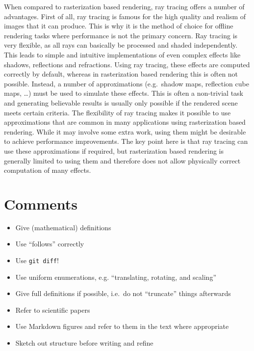 When compared to rasterization based rendering, ray tracing oﬀers a
number of advantages. First of all, ray tracing is famous for the high
quality and realism of images that it can produce. This is why it is the
method of choice for oﬄine rendering tasks where performance is not the
primary concern. Ray tracing is very ﬂexible, as all rays can basically
be processed and shaded independently. This leads to simple and
intuitive implementations of even complex eﬀects like shadows,
reﬂections and refractions. Using ray tracing, these eﬀects are computed
correctly by default, whereas in rasterization based rendering this is
often not possible. Instead, a number of approximations (e.g.~shadow
maps, reﬂection cube maps, \ldots{}) must be used to simulate these
eﬀects. This is often a non-trivial task and generating believable
results is usually only possible if the rendered scene meets certain
criteria. The ﬂexibility of ray tracing makes it possible to use
approximations that are common in many applications using rasterization
based rendering. While it may involve some extra work, using them might
be desirable to achieve performance improvements. The key point here is
that ray tracing can use these approximations if required, but
rasterization based rendering is generally limited to using them and
therefore does not allow physically correct computation of many eﬀects.

\section{Comments}\label{comments}

\begin{itemize}
\itemsep1pt\parskip0pt
\item
  Give (mathematical) definitions
\item
  Use ``follows'' correctly
\item
  Use \texttt{git diff}!
\item
  Use uniform enumerations, e.g. ``translating, rotating, and scaling''
\item
  Give full definitions if possible, i.e.~do not ``truncate'' things
  afterwards
\item
  Refer to scientific papers
\item
  Use Markdown figures and refer to them in the text where appropriate
\item
  Sketch out structure before writing and refine
\end{itemize}
